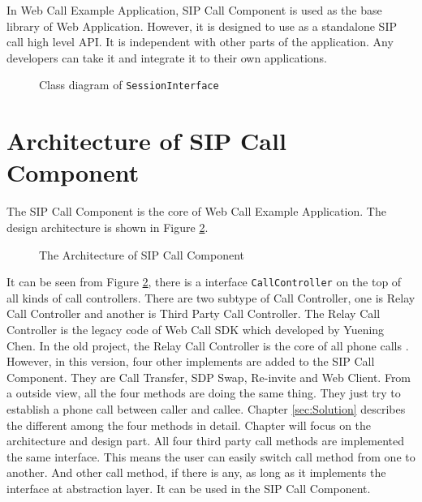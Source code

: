 In Web Call Example Application, SIP Call Component is used as the base library of Web Application. However, it is designed to use as a standalone SIP call high level API. It is independent with other parts of the application. Any developers can take it and integrate it to their own applications.


\begin{figure}[!hbtp]
\centering
{}
\caption{Class diagram of \texttt{SessionInterface}}
\label{fig:ClassDiagramOfSessionInterface}
\end{figure}



\section{Architecture of SIP Call Component}

The SIP Call Component is the core of Web Call Example Application. The design architecture is shown in Figure \ref{fig:TheArchitectureOfSIPCallComponent}.

\begin{figure}[!hbtp]
\centering
{}
\caption{The Architecture of SIP Call Component}
\label{fig:TheArchitectureOfSIPCallComponent}
\end{figure}

It can be seen from Figure \ref{fig:TheArchitectureOfSIPCallComponent}, there is a interface \texttt{CallController} on the top of all kinds of call controllers. There are two subtype of Call Controller, one is Relay Call Controller and another is Third Party Call Controller. The Relay Call Controller is the legacy code of \textsf{Web Call SDK} which developed by Yuening Chen. In the old project, the Relay Call Controller is the core of all phone calls \cite{WebCallSDK}. However, in this version, four other implements are added to the SIP Call Component. They are Call Transfer, SDP Swap, Re-invite and Web Client. From a outside view, all the four methods are doing the same thing. They just try to establish a phone call between caller and callee. Chapter \ref{sec:Solution} describes the different among the four methods in detail. Chapter will focus on the architecture and design part. All four third party call methods are implemented the same interface. This means the user can easily switch call method from one to another. And other call method, if there is any, as long as it implements the interface at abstraction layer. It can be used in the SIP Call Component.

